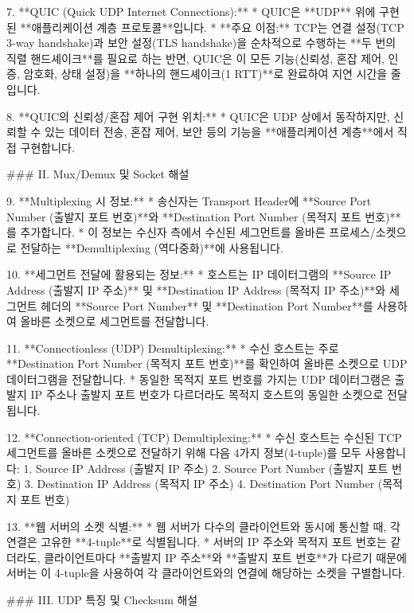 7.  **QUIC (Quick UDP Internet Connections):**
    *   QUIC은 **UDP** 위에 구현된 **애플리케이션 계층 프로토콜**입니다.
    *   **주요 이점:** TCP는 연결 설정(TCP 3-way handshake)과 보안 설정(TLS handshake)을 순차적으로 수행하는 **두 번의 직렬 핸드셰이크**를 필요로 하는 반면, QUIC은 이 모든 기능(신뢰성, 혼잡 제어, 인증, 암호화, 상태 설정)을 **하나의 핸드셰이크(1 RTT)**로 완료하여 지연 시간을 줄입니다.

8.  **QUIC의 신뢰성/혼잡 제어 구현 위치:**
    *   QUIC은 UDP 상에서 동작하지만, 신뢰할 수 있는 데이터 전송, 혼잡 제어, 보안 등의 기능을 **애플리케이션 계층**에서 직접 구현합니다.

### II. Mux/Demux 및 Socket 해설

9.  **Multiplexing 시 정보:**
    *   송신자는 Transport Header에 **Source Port Number (출발지 포트 번호)**와 **Destination Port Number (목적지 포트 번호)**를 추가합니다.
    *   이 정보는 수신자 측에서 수신된 세그먼트를 올바른 프로세스/소켓으로 전달하는 **Demultiplexing (역다중화)**에 사용됩니다.

10. **세그먼트 전달에 활용되는 정보:**
    *   호스트는 IP 데이터그램의 **Source IP Address (출발지 IP 주소)** 및 **Destination IP Address (목적지 IP 주소)**와 세그먼트 헤더의 **Source Port Number** 및 **Destination Port Number**를 사용하여 올바른 소켓으로 세그먼트를 전달합니다.

11. **Connectionless (UDP) Demultiplexing:**
    *   수신 호스트는 주로 **Destination Port Number (목적지 포트 번호)**를 확인하여 올바른 소켓으로 UDP 데이터그램을 전달합니다.
    *   동일한 목적지 포트 번호를 가지는 UDP 데이터그램은 출발지 IP 주소나 출발지 포트 번호가 다르더라도 목적지 호스트의 동일한 소켓으로 전달됩니다.

12. **Connection-oriented (TCP) Demultiplexing:**
    *   수신 호스트는 수신된 TCP 세그먼트를 올바른 소켓으로 전달하기 위해 다음 4가지 정보(4-tuple)를 모두 사용합니다:
        1.  Source IP Address (출발지 IP 주소)
        2.  Source Port Number (출발지 포트 번호)
        3.  Destination IP Address (목적지 IP 주소)
        4.  Destination Port Number (목적지 포트 번호)

13. **웹 서버의 소켓 식별:**
    *   웹 서버가 다수의 클라이언트와 동시에 통신할 때, 각 연결은 고유한 **4-tuple**로 식별됩니다.
    *   서버의 IP 주소와 목적지 포트 번호는 같더라도, 클라이언트마다 **출발지 IP 주소**와 **출발지 포트 번호**가 다르기 때문에 서버는 이 4-tuple을 사용하여 각 클라이언트와의 연결에 해당하는 소켓을 구별합니다.

### III. UDP 특징 및 Checksum 해설


